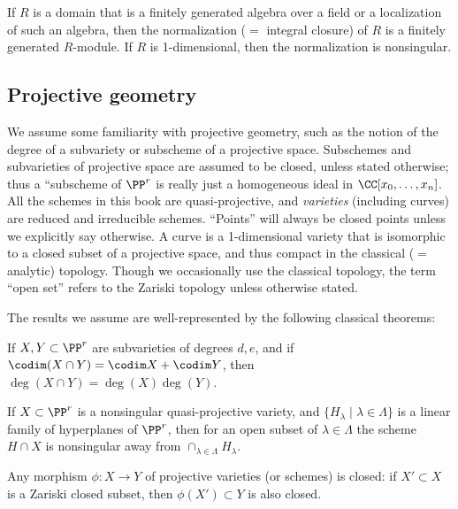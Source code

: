 \begin{theorem}\label{finiteness of normalization}
 If $R$ is a domain that is a finitely generated algebra over a field or a localization of such an algebra, then the
normalization ($=$ integral closure) of $R$ is a finitely generated $R$-module.
If $R$ is 1-dimensional, then the normalization is nonsingular.
\end{theorem}

\subsection{Projective geometry}
We assume some familiarity with projective geometry, such as the notion of the degree of a 
subvariety or subscheme of a projective space. Subschemes and subvarieties of projective space are assumed to be closed, unless stated otherwise; thus a ``subscheme of $\PP^r$ is
really just a homogeneous ideal in $\CC[x_0,\dots, x_n]$. All the schemes in this book are  quasi-projective, and \emph{varieties} (including curves) are reduced and irreducible schemes.  ``Points'' will always be closed points unless we explicitly say otherwise. A curve is a 1-dimensional variety that is isomorphic to a closed subset of a projective space, and thus compact in the classical ($=$ analytic) topology. Though we occasionally use the classical topology, 
the term ``open set'' refers to the Zariski topology unless otherwise stated.

The results we assume are
 well-represented by the following classical theorems:

\begin{theorem}
If $X,Y\subset \PP^r$ are subvarieties of degrees $d,e$, and if $\codim(X\cap Y) = \codim X + \codim Y$,
then $\deg (X\cap Y) = \deg(X)\deg(Y)$.
\end{theorem}

\begin{theorem}\label{Bertini}
If $X\subset \PP^r$  is a nonsingular quasi-projective variety, and $\{H_\lambda \mid \lambda\in \Lambda\}$ is a linear family of hyperplanes of $\PP^r$, then for an open subset of $\lambda\in \Lambda$ the scheme $H\cap X$ is nonsingular away from 
$
\cap_{\lambda \in \Lambda} H_\lambda.
$
\end{theorem}

\begin{theorem}
 Any morphism $\phi: X\to Y$ of projective varieties (or schemes) is closed: if $X'\subset X$ is a Zariski closed subset,
 then $\phi(X') \subset Y$ is also closed.
\end{theorem}


